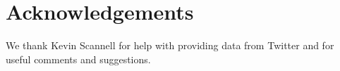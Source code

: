 \documentclass[11pt]{article}
\begin{document}


\section*{Acknowledgements}

We thank Kevin Scannell for help with providing data from Twitter and for useful comments and suggestions.



\end{document}
